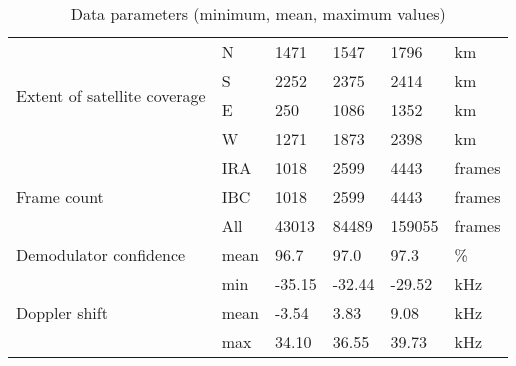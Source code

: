 \begin{table}
\begin{tabular}{p{1in}l|llll}
\multirow{4}{1in}{Extent of satellite coverage} &  N     & 1471 & 1547 & 1796 & km     \\ 
                                            &  S     & 2252 & 2375 & 2414 & km     \\ 
                                            &  E     & 250  & 1086 & 1352  & km     \\ 
                                            &  W     & 1271 & 1873 & 2398 & km     \\  \hline
\multirow{3}{1in}{Frame count}                  &  IRA   & 1018 & 2599 & 4443 &     frames \\ 
                                            &  IBC   & 1018 & 2599 & 4443 &     frames \\ 
                                            &  All   & 43013 & 84489 & 159055 & frames     \\  \hline
Demodulator confidence                      &  mean  & 96.7 & 97.0 & 97.3 &  \%    \\ \hline
\multirow{3}{1in}{Doppler shift}            &  min   & -35.15 & -32.44 & -29.52 & kHz \\
                                            &  mean  & -3.54 & 3.83 & 9.08 &      kHz \\
                                            &  max   & 34.10 & 36.55 & 39.73 &    kHz \\
    \end{tabular}
    \caption{Data parameters (minimum, mean, maximum values)}
    \label{t_exp_data_param}
\end{table}


